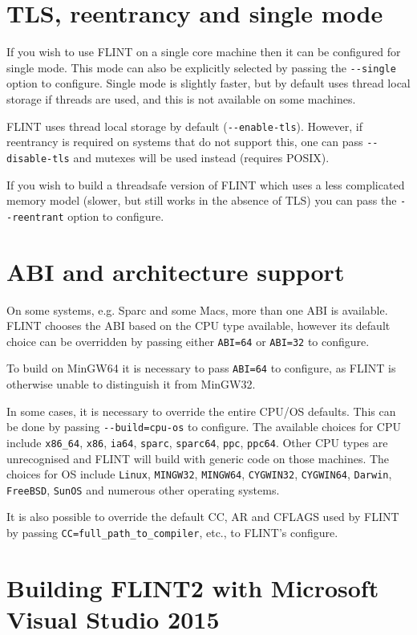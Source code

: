 \documentclass[a4paper,10pt]{book}
\newcommand{\code}{\lstinline}
\begin{document}
\chapter{TLS, reentrancy and single mode}

If you wish to use FLINT on a single core machine then it can be
configured for single mode. This mode can also be explicitly selected
by passing the \code{--single} option to configure. Single mode is
slightly faster, but by default uses thread local storage if threads
are used, and this is not available on some machines.

FLINT uses thread local storage by default (\code{--enable-tls}).
However, if reentrancy is required on systems that do not support
this, one can pass \code{--disable-tls} and mutexes will be used
instead (requires POSIX).

If you wish to build a threadsafe version of FLINT which uses a
less complicated memory model (slower, but still works in the absence
of TLS) you can pass the \code{--reentrant} option to configure.

\chapter{ABI and architecture support}

On some systems, e.g. Sparc and some Macs, more than one ABI is
available. FLINT chooses the ABI based on the CPU type available,
however its default choice can be overridden by passing either
\code{ABI=64} or \code{ABI=32} to configure.

To build on MinGW64 it is necessary to pass \code{ABI=64} to
configure, as FLINT is otherwise unable to distinguish it from
MinGW32.

In some cases, it is necessary to override the entire CPU/OS
defaults. This can be done by passing \code{--build=cpu-os} to
configure. The available choices for CPU include \code{x86_64},
\code{x86}, \code{ia64}, \code{sparc}, \code{sparc64}, \code{ppc},
\code{ppc64}. Other CPU types are unrecognised and FLINT will
build with generic code on those machines. The choices for OS
include \code{Linux}, \code{MINGW32}, \code{MINGW64},
\code{CYGWIN32}, \code{CYGWIN64}, \code{Darwin}, \code{FreeBSD},
\code{SunOS} and numerous other operating systems.

It is also possible to override the default CC, AR and CFLAGS used
by FLINT by passing \code{CC=full_path_to_compiler}, etc., to
FLINT's configure.

\chapter{Building FLINT2 with Microsoft Visual Studio 2015}
\end{document}
